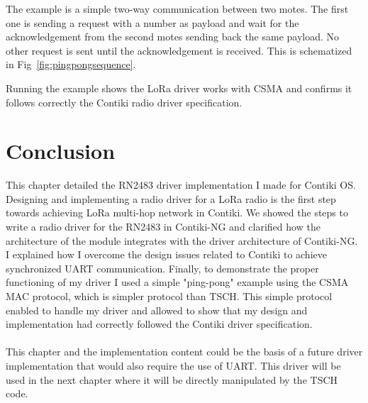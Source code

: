 

The example is a simple two-way communication between two motes.
The first one is sending a request with a number as
payload and wait for the acknowledgement from the second motes sending back
the same payload.
No other request is sent until the acknowledgement is received.
This is schematized in Fig~\ref{fig:pingpongsequence}.



Running the example shows the LoRa driver works with CSMA and confirms
it follows correctly the Contiki radio driver specification.

\section{Conclusion}

This chapter detailed the RN2483 driver implementation I made for Contiki OS.
Designing and implementing a radio driver for a LoRa radio is the first step towards achieving LoRa
multi-hop network in Contiki.
We showed the steps to write a radio driver for the RN2483 in Contiki-NG and clarified how
the architecture of the module integrates with the driver architecture of Contiki-NG.
I explained how I overcome the design issues related to Contiki to achieve
synchronized UART communication.
Finally, to demonstrate the proper functioning of my driver I used a simple "ping-pong" example
using the CSMA MAC protocol, which is simpler protocol than TSCH.
This simple protocol enabled to handle my
driver and allowed to show that my design and implementation had correctly followed the Contiki driver
specification.

\paragraph{}

This chapter and the implementation content could be the basis of a future
driver implementation that would also require the use of UART.
This driver will be used in the next chapter where it will be directly
manipulated by the TSCH code.
